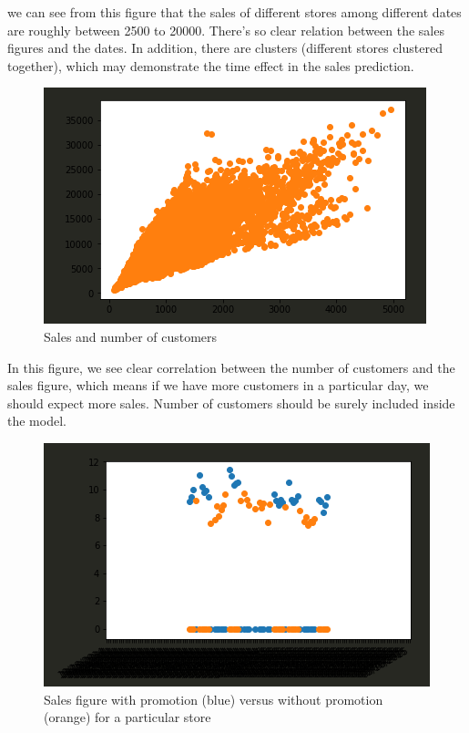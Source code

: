 \documentclass{article}
\begin{document}
we can see from this figure that the sales of different stores among different dates are roughly between 2500 to 20000. There's so clear relation between the sales figures and the dates. In addition, there are clusters (different stores clustered together), which may demonstrate the time effect in the sales prediction.

\begin{figure}[h]
	\centering
	\includegraphics[scale=0.35]{customer_sales.png}
	\caption{Sales and number of customers}
\end{figure}

In this figure, we see clear correlation between the number of customers and the sales figure, which means if we have more customers in a particular day, we should expect more sales. Number of customers should be surely included inside the model.

\begin{figure}[h]
	\centering
	\includegraphics[scale=0.35]{typical_promotion_effect.png}
	\caption{Sales figure with promotion (blue) versus without promotion (orange) for a particular store}
\end{figure}
\end{document}

